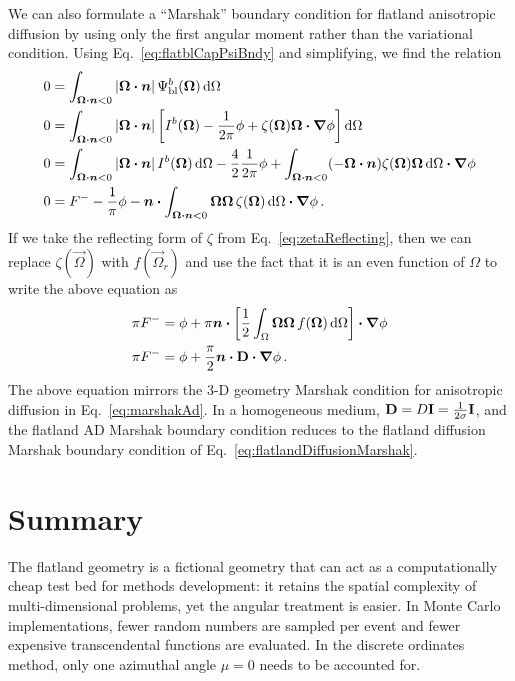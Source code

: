 We can also formulate a ``Marshak'' boundary condition for flatland anisotropic
diffusion by using only the first angular moment rather than the variational
condition. Using Eq.~\eqref{eq:flatblCapPsiBndy} and simplifying, we find the
relation
\begin{align*}
  0 &= \int_{\bm{\Omega}\bm{\cdot} \bm{n} < 0}
  \left| \bm{\Omega}\bm{\cdot} \bm{n} \right| \Psi_\mathrm{bl}^b(\bm{\Omega}) \mathop{}\!\mathrm{d} \Omega
  \\
  0 &= \int_{\bm{\Omega}\bm{\cdot} \bm{n} < 0}
  \left| \bm{\Omega}\bm{\cdot} \bm{n} \right| 
  \left[ I^b(\bm{\Omega}) - \frac{1}{2\pi} \phi
  + \zeta(\bm{\Omega}) \bm{\Omega}\bm{\cdot} \bm{\nabla} \phi \right] \mathop{}\!\mathrm{d} \Omega
  \\
  0 &= \int_{\bm{\Omega}\bm{\cdot} \bm{n} < 0}
  \left| \bm{\Omega}\bm{\cdot} \bm{n} \right| I^b(\bm{\Omega}) \mathop{}\!\mathrm{d} \Omega
  -  \frac{4}{2} \frac{1}{2\pi} \phi
  + \int_{\bm{\Omega}\bm{\cdot} \bm{n} < 0} (- \bm{\Omega}\bm{\cdot}
  \bm{n}) \zeta(\bm{\Omega}) \bm{\Omega} \mathop{}\!\mathrm{d} \Omega \bm{\cdot} \bm{\nabla} \phi
  \\
  0 &= F^-
  - \frac{1}{\pi} \phi
  - \bm{n} \bm{\cdot} \int_{\bm{\Omega}\bm{\cdot} \bm{n} < 0} \bm{\Omega} \bm{\Omega}\,
  \zeta(\bm{\Omega}) \mathop{}\!\mathrm{d} \Omega \bm{\cdot} \bm{\nabla} \phi\,.
\end{align*}
If we take the reflecting form of $\zeta$ from Eq.~\eqref{eq:zetaReflecting},
then we can replace $\zeta(\vec{\Omega})$ with $f(\vec{\Omega}_r)$ and use the
fact that it is an even function of $\Omega$ to write the above equation as
\begin{align*}
  \pi F^-
  &= \phi
  + \pi \bm{n} \bm{\cdot} \left[ \frac{1}{2} \int_{\Omega} \bm{\Omega}
  \bm{\Omega}\, f(\bm{\Omega}) \mathop{}\!\mathrm{d} \Omega \right] \bm{\cdot} \bm{\nabla} \phi
  \\
  \pi F^-
  &= \phi
  + \frac{\pi}{2} \bm{n} \bm{\cdot} \mathbf{D} \bm{\cdot} \bm{\nabla} \phi\,.
\end{align*}
The above equation mirrors the 3-D geometry Marshak condition for anisotropic
diffusion in Eq.~\eqref{eq:marshakAd}.  In a homogeneous medium,
$\mathbf{D}= D \mathbf{I} = \frac{1}{2\sigma} \mathbf{I}$, and the flatland AD
Marshak boundary condition
reduces to the flatland diffusion Marshak boundary condition of
Eq.~\eqref{eq:flatlandDiffusionMarshak}.

\section{Summary}
The flatland geometry is a fictional geometry that can act as a computationally
cheap test bed for methods development: it retains the spatial complexity of
multi-dimensional problems, yet the angular treatment is easier. In Monte Carlo
implementations, fewer random numbers are sampled per event and fewer expensive
transcendental functions are evaluated. In the discrete ordinates method, only
one azimuthal angle $\mu=0$ needs to be accounted for.

